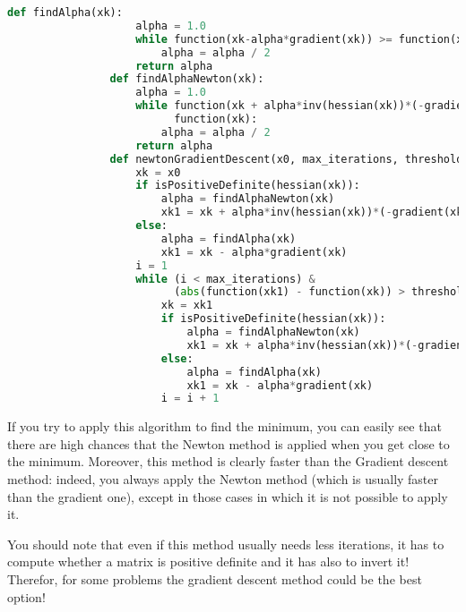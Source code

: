             \begin{lstlisting}[language=Python]
                def findAlpha(xk):
                    alpha = 1.0
                    while function(xk-alpha*gradient(xk)) >= function(xk):
                        alpha = alpha / 2
                    return alpha
                def findAlphaNewton(xk):
                    alpha = 1.0
                    while function(xk + alpha*inv(hessian(xk))*(-gradient(xk))) >
                          function(xk):
                        alpha = alpha / 2
                    return alpha
                def newtonGradientDescent(x0, max_iterations, threshold):
                    xk = x0
                    if isPositiveDefinite(hessian(xk)):
                        alpha = findAlphaNewton(xk)
                        xk1 = xk + alpha*inv(hessian(xk))*(-gradient(xk))
                    else:
                        alpha = findAlpha(xk)
                        xk1 = xk - alpha*gradient(xk)
                    i = 1
                    while (i < max_iterations) &
                          (abs(function(xk1) - function(xk)) > threshold):
                        xk = xk1
                        if isPositiveDefinite(hessian(xk)):
                            alpha = findAlphaNewton(xk)
                            xk1 = xk + alpha*inv(hessian(xk))*(-gradient(xk))
                        else:
                            alpha = findAlpha(xk)
                            xk1 = xk - alpha*gradient(xk)
                        i = i + 1
            \end{lstlisting}
            If you try to apply this algorithm to find the minimum, you can easily see that there are high chances that the Newton method is applied when you get close to the minimum. Moreover, this method is clearly faster than the Gradient descent method: indeed, you always apply the Newton method (which is usually faster than the gradient one), except in those cases in which it is not possible to apply it.\par
            You should note that even if this method usually needs less iterations, it has to compute whether a matrix is positive definite and it has also to invert it! Therefor, for some problems the gradient descent method could be the best option!

